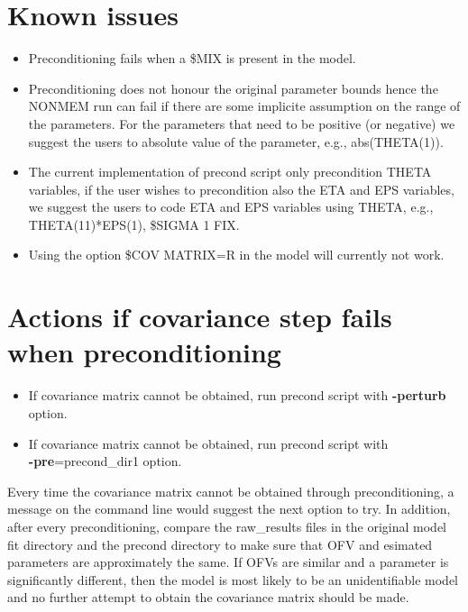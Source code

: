 \section{Known issues}

\begin{itemize}
    \item Preconditioning fails when a \$MIX is present in the model.

    \item Preconditioning does not honour the original parameter bounds hence the NONMEM run can fail if there are some implicite assumption on the range of the parameters.  For the parameters that need to be positive (or negative) we suggest the users to absolute value of the parameter, e.g., abs(THETA(1)).

    \item The current implementation of precond script only precondition THETA variables, if the user wishes to precondition also the ETA and EPS variables, we suggest the users to code ETA and EPS variables using THETA, e.g., THETA(11)*EPS(1), \$SIGMA 1 FIX.

    \item Using the option \$COV MATRIX=R in the model will currently not work.
\end{itemize}

\section{Actions if covariance step fails when preconditioning}

\begin{itemize}
    \item If covariance matrix cannot be obtained, run precond script with \mbox{{\bf -perturb}} option.
\item If covariance matrix cannot be obtained, run precond script with \\ \mbox{{\bf -pre}}=precond\_dir1 option.
\end{itemize}

Every time the covariance matrix cannot be obtained through preconditioning, a message on the command line would suggest the next option to try.  In addition, after every preconditioning, compare the raw\_results files in the original model fit directory and the precond directory to make sure that OFV and esimated parameters are approximately the same.  If OFVs are similar and a parameter is significantly different, then the model is most likely to be an unidentifiable model and no further attempt to obtain the covariance matrix should be made.



